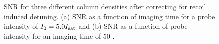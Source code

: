 %
%


\begin{figure}
\caption{SNR for three different column densities after correcting for recoil induced detuning. (a) SNR as a function of imaging time for a probe intensity of $I_0=5.0 I_{\rm sat}$ and (b) SNR as a function of probe intensity for an imaging time of 50 \us{}.}
\label{fig:SNR}
\end{figure}

%
